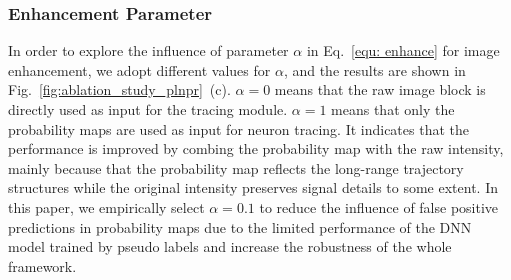 \subsubsection{Enhancement Parameter} 

In order to explore the influence of parameter $\alpha$ in Eq.~\eqref{equ: enhance} for image enhancement, we adopt different values for $\alpha$, and the results are shown in Fig.~\ref{fig:ablation_study_plnpr}~(c).
$\alpha=0$ means that the raw image block is directly used as input for the tracing module.
$\alpha=1$ means that only the probability maps are used as input for neuron tracing. 
It indicates that the performance is improved by combing the probability map with the raw intensity, mainly because that the probability map reflects the long-range trajectory structures while the original intensity preserves signal details to some extent.
In this paper, we empirically select $\alpha=0.1$ to reduce the influence of false positive predictions in probability maps due to the limited performance of the DNN model trained by pseudo labels and increase the robustness of the whole framework.



